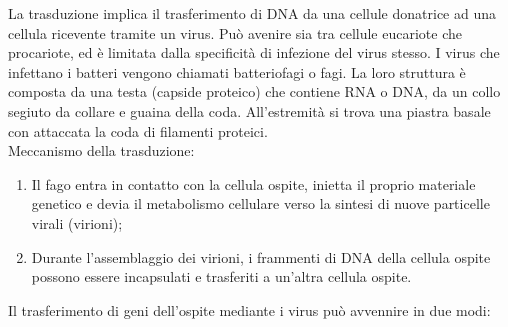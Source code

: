 La trasduzione implica il trasferimento di DNA da una cellule donatrice ad una cellula ricevente tramite un virus. Può avenire sia tra cellule eucariote che procariote, ed è limitata dalla specificità di infezione del virus stesso. I virus che infettano i batteri vengono chiamati batteriofagi o fagi. La loro struttura è composta da una testa (capside proteico) che contiene RNA o DNA, da un collo segiuto da collare e guaina della coda. All'estremità si trova una piastra basale con attaccata la coda di filamenti proteici. 
\\Meccanismo della trasduzione:
\begin{enumerate}
    \item Il fago entra in contatto con la cellula ospite, inietta il proprio materiale genetico e devia il metabolismo cellulare verso la sintesi di nuove particelle virali (virioni); 
    \item Durante l'assemblaggio dei virioni, i frammenti di DNA della cellula ospite possono essere incapsulati e trasferiti a un'altra cellula ospite.
\end{enumerate}
Il trasferimento di geni dell'ospite mediante i virus può avvennire in due modi: 
